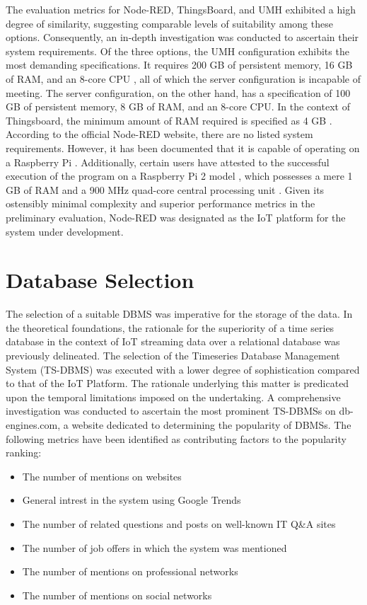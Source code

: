 {The evaluation metrics for Node-RED, ThingsBoard, and UMH exhibited a high degree of similarity, suggesting comparable levels of suitability among these options. Consequently, an in-depth investigation was conducted to ascertain their system requirements. Of the three options, the UMH configuration exhibits the most demanding specifications. It requires 200 GB of persistent memory, 16 GB of RAM, and an 8-core CPU \cite{UMHInstallationRequirements}, all of which the server configuration is incapable of meeting. The server configuration, on the other hand, has a specification of 100 GB of persistent memory, 8 GB of RAM, and an 8-core CPU. In the context of Thingsboard, the minimum amount of RAM required is specified as 4 GB \cite{thingsboardInstallingThingsBoardCE}. According to the official Node-RED website, there are no listed system requirements. However, it has been documented that it is capable of operating on a Raspberry Pi \cite{RunningNodeREDLocally}. Additionally, certain users have attested to the successful execution of the program on a Raspberry Pi 2 model \cite{NodeRedMinimun2020}, which possesses a mere 1 GB of RAM and a 900 MHz quad-core central processing unit  \cite{ltdBuyRaspberryPi}. Given its ostensibly minimal complexity and superior performance metrics in the preliminary evaluation, Node-RED was designated as the IoT platform for the system under development.

\section{Database Selection}
The selection of a suitable DBMS was imperative for the storage of the data. In the theoretical foundations, the rationale for the superiority of a time series database in the context of IoT streaming data over a relational database was previously delineated. The selection of the Timeseries Database Management System (TS-DBMS) was executed with a lower degree of sophistication compared to that of the IoT Platform. The rationale underlying this matter is predicated upon the temporal limitations imposed on the undertaking. A comprehensive investigation was conducted to ascertain the most prominent TS-DBMSs on db-engines.com, a website dedicated to determining the popularity of DBMSs. The following metrics have been identified as contributing factors to the popularity ranking:

\begin{itemize}
	\item The number of mentions on websites
	\item General intrest in the system using Google Trends
	\item The number of related questions and posts on well-known IT Q\&A sites
	\item The number of job offers in which the system was mentioned
	\item The number of mentions on professional networks
	\item The number of mentions on social networks
\end{itemize}

}
